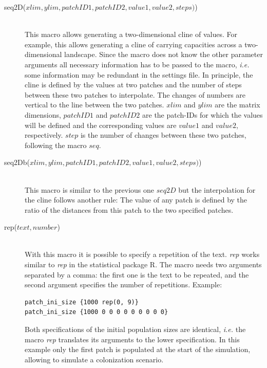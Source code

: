 \documentclass[letterpaper,12pt,oneside]{book}
\begin{document}
\begin{description}
\item[seq2D($xlim, ylim, patchID1, patchID2, value1, value2, steps)$)]\hspace*{\fill}\\
This macro allows generating a two-dimensional cline of values. For example, this allows generating a cline of carrying capacities across a two-dimensional landscape. Since the macro does not know the other parameter arguments all necessary information has to be passed to the macro, \textit{i.e.} some information may be redundant in the settings file. In principle, the cline is defined by the values at two patches and the number of steps between these two patches to interpolate. The changes of numbers are vertical to the line between the two patches. $xlim$ and $ylim$ are the matrix dimensions, $patchID1$ and $patchID2$ are the patch-IDs for which the values will be defined and the corresponding values are $value1$ and $value2$, respectively. $step$ is the number of changes between these two patches, following the macro $seq$.

\item[seq2Db($xlim, ylim, patchID1, patchID2, value1, value2, steps)$)]\hspace*{\fill}\\
This macro is similar to the previous one $seq2D$ but the interpolation for the cline follows another rule: The value of any patch is defined by the ratio of the distances from this patch to the two specified patches.

\item[rep($text, number$)]\hspace*{\fill}\\
With this macro it is possible to specify a repetition of the text. \textit{rep} works similar to \textit{rep} in the statistical package R. The macro needs two arguments separated by a comma: the first one is the text to be repeated, and the second argument specifies the number of repetitions. Example:
\begin{lstlisting}[frame=single]
patch_ini_size {1000 rep(0, 9)}
patch_ini_size {1000 0 0 0 0 0 0 0 0 0}
\end{lstlisting}
Both specifications of the initial population sizes are identical, \textit{i.e.} the macro \textit{rep} translates its arguments to the lower specification. In this example only the first patch is populated at the start of the simulation, allowing to simulate a colonization scenario. 


\end{description}
\end{document}
